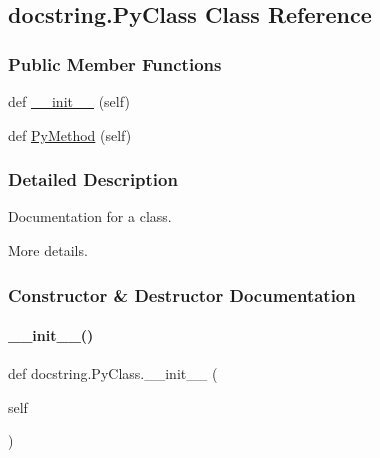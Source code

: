 \hypertarget{classdocstring_1_1_py_class}{}\subsection{docstring.\+Py\+Class Class Reference}
\label{classdocstring_1_1_py_class}
\subsubsection*{Public Member Functions}
\begin{DoxyCompactItemize}
\item 
def \hyperlink{classdocstring_1_1_py_class_a00dd800dc15e2b727e2a37c6f6c40e8b}{\+\_\+\+\_\+init\+\_\+\+\_\+} (self)
\item 
def \hyperlink{classdocstring_1_1_py_class_af092e1eacc10334e0e8630531a3473b4}{Py\+Method} (self)
\end{DoxyCompactItemize}


\subsubsection{Detailed Description}
\begin{DoxyVerb}Documentation for a class.

More details.
\end{DoxyVerb}
 

\subsubsection{Constructor \& Destructor Documentation}
\mbox{\label{classdocstring_1_1_py_class_a00dd800dc15e2b727e2a37c6f6c40e8b}} 
\paragraph{\texorpdfstring{\+\_\+\+\_\+init\+\_\+\+\_\+()}{\_\_init\_\_()}}
{\footnotesize\ttfamily def docstring.\+Py\+Class.\+\_\+\+\_\+init\+\_\+\+\_\+ (\begin{DoxyParamCaption}\item[{}]{self }\end{DoxyParamCaption})}

